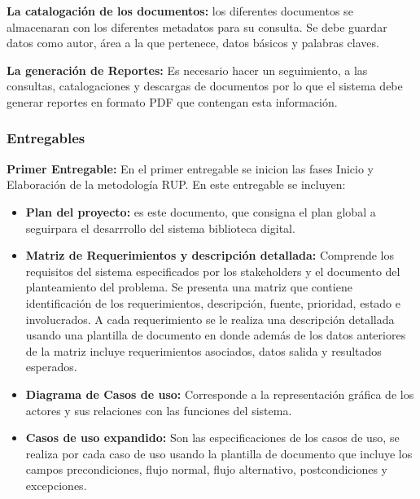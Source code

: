         \textbf{La catalogación de los documentos:} los diferentes documentos se almacenaran con 
        los diferentes metadatos para su consulta. Se debe guardar datos como autor, área a la que 
        pertenece, datos básicos y palabras claves.
        
        \textbf{La generación de Reportes:} Es necesario hacer un seguimiento, a las consultas,
        catalogaciones y descargas de documentos por lo que el sistema debe generar reportes en 
        formato PDF que contengan esta información.
        
                \subsubsection{Entregables}
                \textbf{Primer Entregable:} En el primer entregable se inicion las fases Inicio y
                Elaboración de la metodología RUP. En este entregable se incluyen:
                
                \begin{itemize}
                \item\textbf{Plan del proyecto:} es este documento, que consigna el plan global a
                seguirpara el desarrrollo del sistema biblioteca digital.
                \item\textbf{Matriz de Requerimientos y descripción detallada:} Comprende los
                requisitos del sistema especificados por los stakeholders y el documento del
                planteamiento del problema.
                Se presenta una matriz que contiene identificación de los requerimientos,
                descripción, fuente, prioridad, estado e involucrados. A cada requerimiento se le
                realiza una descripción detallada usando una plantilla de documento en donde además
                de los datos anteriores de la matriz incluye requerimientos asociados, datos salida
                y resultados esperados.
                \item\textbf{Diagrama de Casos de uso:} Corresponde a la representación gráfica de
                los actores y sus relaciones con las funciones del sistema.
                \item\textbf{Casos de uso expandido:} Son las especificaciones de los casos de uso,
                se realiza por cada caso de uso usando la plantilla de documento que incluye los
                campos precondiciones, flujo normal, flujo alternativo, postcondiciones y 
                excepciones.
                \end{itemize}
                
